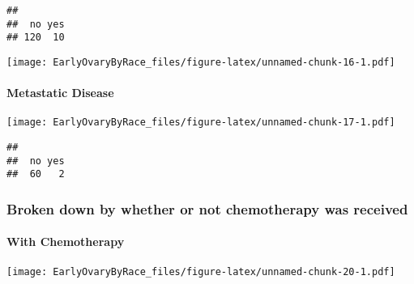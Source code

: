 \documentclass[
]{article}
\newenvironment{Shaded}{\begin{snugshade}}{\end{snugshade}}
\newcommand{\KeywordTok}[1]{\textcolor[rgb]{0.13,0.29,0.53}{\textbf{#1}}}
\newcommand{\NormalTok}[1]{#1}
\newcommand{\OperatorTok}[1]{\textcolor[rgb]{0.81,0.36,0.00}{\textbf{#1}}}
\begin{document}
\begin{Shaded}
\end{Shaded}

\begin{verbatim}
## 
##  no yes 
## 120  10
\end{verbatim}

\texttt{[image: EarlyOvaryByRace\_files/figure-latex/unnamed-chunk-16-1.pdf]}

\hypertarget{metastatic-disease}{%
\paragraph{Metastatic Disease}\label{metastatic-disease}}

\texttt{[image: EarlyOvaryByRace\_files/figure-latex/unnamed-chunk-17-1.pdf]}

\begin{Shaded}
\end{Shaded}

\begin{verbatim}
## 
##  no yes 
##  60   2
\end{verbatim}

\hypertarget{broken-down-by-whether-or-not-chemotherapy-was-received}{%
\subsubsection{Broken down by whether or not chemotherapy was
received}\label{broken-down-by-whether-or-not-chemotherapy-was-received}}

\hypertarget{with-chemotherapy}{%
\paragraph{With Chemotherapy}\label{with-chemotherapy}}

\texttt{[image: EarlyOvaryByRace\_files/figure-latex/unnamed-chunk-20-1.pdf]}

\begin{Shaded}
\end{Shaded}
\end{document}
